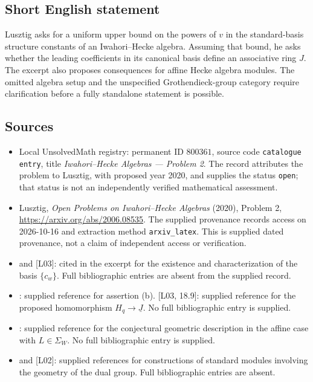 \documentclass[11pt]{article}
\begin{document}
\subsection{Short English statement}
Lusztig asks for a uniform upper bound on the powers of \(v\) in the standard-basis structure constants of an Iwahori--Hecke algebra. Assuming that bound, he asks whether the leading coefficients in its canonical basis define an associative ring \(J\). The excerpt also proposes consequences for affine Hecke algebra modules. The omitted algebra setup and the unspecified Grothendieck-group category require clarification before a fully standalone statement is possible.
\subsection{Sources}
\begin{itemize}
\item Local UnsolvedMath registry: permanent ID \(800361\), source code \texttt{catalogue entry}, title \emph{Iwahori--Hecke Algebras --- Problem 2}. The record attributes the problem to Lusztig, with proposed year 2020, and supplies the status \texttt{open}; that status is not an independently verified mathematical assessment.
\item Lusztig, \emph{Open Problems on Iwahori--Hecke Algebras} (2020), Problem 2, \url{https://arxiv.org/abs/2006.08535}. The supplied provenance records access on 2026-10-16 and extraction method \texttt{arxiv\_latex}. This is supplied dated provenance, not a claim of independent access or verification.
\item [KL] and [L03]: cited in the excerpt for the existence and characterization of the basis \(\{c_w\}\). Full bibliographic entries are absent from the supplied record.
\item [L03, 13.4]: supplied reference for assertion (b). [L03, 18.9]: supplied reference for the proposed homomorphism \(H_q\to\underline J\). No full bibliographic entry is supplied.
\item [L16, 3.11]: supplied reference for the conjectural geometric description in the affine case with \(L\in\Sigma_W\). No full bibliographic entry is supplied.
\item [L95] and [L02]: supplied references for constructions of standard modules involving the geometry of the dual group. Full bibliographic entries are absent.
\end{itemize}
\end{document}
